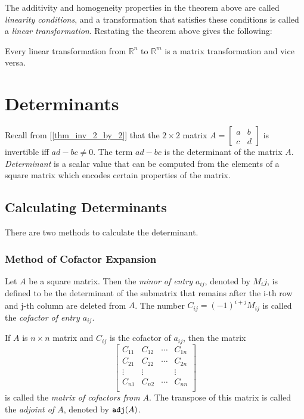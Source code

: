 \documentclass{report}
\begin{document}
		The additivity and homogeneity properties in the theorem above are called \emph{linearity conditions}, and a transformation that satisfies these conditions is called a \emph{linear transformation}. Restating the theorem above gives the following:
		
		\begin{thm}
			Every linear transformation from $\mathbb{R}^n$ to $\mathbb{R}^m$ is a matrix transformation and vice versa.
		\end{thm}
	
	\section{Determinants}
		Recall from [\ref{thm_inv_2_by_2}] that the $2 \times 2$ matrix $A=\begin{bmatrix} a & b \\ c & d \end{bmatrix}$ is invertible iff $ad-bc \ne 0$. The term $ad-bc$ is the determinant of the matrix $A$. \emph{Determinant} is a scalar value that can be computed from the elements of a square matrix which encodes certain properties of the matrix.
		\subsection{Calculating Determinants}
			There are two methods to calculate the determinant.
			\subsubsection{Method of Cofactor Expansion}
				\begin{defn}
					Let $A$ be a square matrix. Then the \emph{minor of entry $a_{ij}$}, denoted by $M_ij$, is defined to be the determinant of the submatrix that remains after the i-th row and j-th column are deleted from $A$. The number $C_{ij}=(-1)^{i+j}M_{ij}$ is called the \emph{cofactor of entry $a_{ij}$}.
				\end{defn}
				
				\begin{defn}[Adjoint]
					If $A$ is $n \times n$ matrix and $C_{ij}$ is the cofactor of $a_{ij}$, then the matrix
					\begin{displaymath}
					\begin{bmatrix}
						C_{11} & C_{12} & \cdots & C_{1n} \\
						C_{21} & C_{22} & \cdots & C_{2n} \\
						\vdots & \vdots &        & \vdots \\
						C_{n1} & C_{n2} & \cdots & C_{nn} \\
					\end{bmatrix}
					\end{displaymath}
					is called the \emph{matrix of cofactors from $A$}. The transpose of this matrix is called the \emph{adjoint of $A$}, denoted by $\verb|adj|(A)$.
				\end{defn}
				
\end{document}
